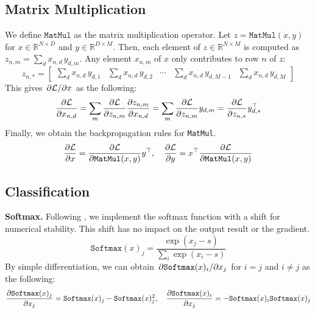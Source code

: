 \documentclass{lucas-report}
\begin{document}
\subsection{Matrix Multiplication}

We define \(\texttt{MatMul}\) as the matrix multiplication operator.
Let $z = \texttt{MatMul}(x, y)$ for \(x \in \mathbb{R}^{N \times D}\) and \(y \in \mathbb{R}^{D \times M}\).
Then, each element of \(z \in \mathbb{R}^{N \times M}\) is computed as \(z_{n,m} = \sum_d x_{n,d}\,y_{d,m}\).
Any element \(x_{n,m}\) of \(x\) only contributes to row $n$ of \(z\):
\[
  z_{n,*} =
  \begin{bmatrix}
    \sum_d x_{n,d}\,y_{d,1} & \sum_d x_{n,d}\,y_{d,2} & \cdots & \sum_d x_{n,d}\,y_{d,M-1} & \sum_d x_{n,d}\,y_{d,M}
  \end{bmatrix}
\]
This gives \(\pdv{\ensuremath{\mathcal{L}}}/{x}\) as the following:
\[
  \pdv{\ensuremath{\mathcal{L}}}{x_{n,d}} =
  \sum_m \pdv{\ensuremath{\mathcal{L}}}{{z_{n,m}}} \pdv{z_{n,m}}{x_{n,d}} =
  \sum_m \pdv{\ensuremath{\mathcal{L}}}{{z_{n,m}}} y_{d,m} =
  \pdv{\ensuremath{\mathcal{L}}}{{z_{n,*}}} y_{d,*}^\top
\]
Finally, we obtain the backpropagation rules for \texttt{MatMul}.
\[
  \pdv{\ensuremath{\mathcal{L}}}{x} = \pdv{\ensuremath{\mathcal{L}}}{{\texttt{MatMul}(x, y)}} y^\top, \quad
  \pdv{\ensuremath{\mathcal{L}}}{y} = x^\top \pdv{\ensuremath{\mathcal{L}}}{{\texttt{MatMul}(x, y)}}
\]

\subsection{Classification}

\textbf{Softmax.} Following \cite{accurate-softmax}, we implement the softmax function with a shift for numerical stability.
This shift has no impact on the output result or the gradient.
\[
  \texttt{Softmax}(x)_j = \frac{\exp{(x_j - s)}}{\sum_i{\exp{(x_i - s)}}}
\]
By simple differentiation, we can obtain \(\pdv{\texttt{Softmax}(x)_i}/{x_j}\) for $i=j$ and $i\neq j$ as the following:
\[
  \pdv{\texttt{Softmax}(x)_j}{x_j} = \texttt{Softmax}(x)_j - \texttt{Softmax}(x)_j^2,
  \quad \pdv{\texttt{Softmax}(x)_i}{x_j} = - \texttt{Softmax}(x)_i \texttt{Softmax}(x)_j
\]

\end{document}
